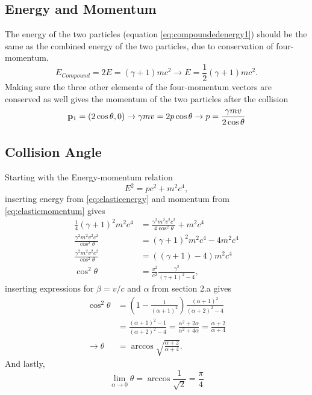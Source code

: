 \documentclass[11pt]{amsart}
\begin{document}
\subsection{Energy and Momentum}
The energy of the two particles (equation \ref{eq:compoundedenergy1}) should be the same as the combined energy of the two particles, due to conservation of four-momentum.
\begin{equation}
\label{eq:elasticenergy}
E_{Compound} = 2E = (\gamma + 1)mc^2 \rightarrow E = \frac{1}{2}(\gamma + 1)mc^2.
\end{equation}
Making sure the three other elements of the four-momentum vectors are conserved as well gives the momentum of the two particles after the collision
\begin{equation}
\label{eq:elasticmomentum}
\vb{p}_1 = (2\cos\theta, 0) \rightarrow \gamma mv = 2p\cos\theta \rightarrow p = \frac{\gamma mv}{2\cos\theta}
\end{equation}

\subsection{Collision Angle}
Starting with the Energy-momentum relation
\begin{equation*}
E^2 = pc^2 + m^2c^4,
\end{equation*}
inserting energy from \ref{eq:elasticenergy} and momentum from \ref{eq:elasticmomentum} gives
\begin{align*}
\frac{1}{4}(\gamma + 1)^2m^2c^4 &= \frac{\gamma^2m^2v^2c^2}{4\cos^2\theta} + m^2c^4 \\
\frac{\gamma^2m^2v^2c^2}{\cos^2\theta} &= (\gamma +1 )^2m^2c^4 - 4m^2c^4 \\
\frac{\gamma^2m^2v^2c^2}{\cos^2\theta} &= ((\gamma + 1) - 4)m^2c^4 \\
\cos^2\theta &= \frac{v^2}{c^2}\frac{\gamma^2}{(\gamma + 1)^2 - 4}, 
\end{align*}
inserting expressions for $\beta = v/c$ and $\alpha$ from section 2.a gives
\begin{align*}
\cos^2\theta &= \left(1 - \frac{1}{(\alpha +1)^2} \right) \frac{(\alpha + 1)^2}{(\alpha + 2)^2 - 4}\\
			&= \frac{(\alpha + 1)^2 - 1}{(\alpha + 2)^2 -4} = \frac{\alpha^2 + 2\alpha}{\alpha^2 + 4\alpha} = \frac{\alpha + 2}{\alpha + 4} \\
\rightarrow \theta &= \arccos \sqrt{\frac{\alpha + 2}{\alpha + 4}}.
\end{align*}
And lastly,
\begin{equation}
\lim_{\alpha\to 0}\theta = \arccos\frac{1}{\sqrt{2}} = \frac{\pi}{4}
\end{equation}
\end{document}
